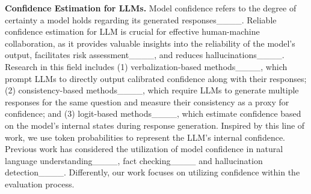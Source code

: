 \textbf{Confidence Estimation for LLMs.} 
Model confidence refers to the degree of certainty a model holds regarding its generated responses____. Reliable confidence estimation for LLM is crucial for effective human-machine collaboration, as it provides valuable insights into the reliability of the model’s output, facilitates risk assessment____, and reduces hallucinations____. Research in this field includes (1) verbalization-based methods____, which prompt LLMs to directly output calibrated confidence along with their responses; (2) consistency-based methods____, which require LLMs to generate multiple responses for the same question and measure their consistency as a proxy for confidence; and (3) logit-based methods____, which estimate confidence based on the model's internal states during response generation. Inspired by this line of work, we use token probabilities to represent the LLM's internal confidence. Previous work has considered the utilization of model confidence in natural language understanding____, fact checking____ and hallucination detection____. Differently, our work focuses on utilizing confidence within the evaluation process.


